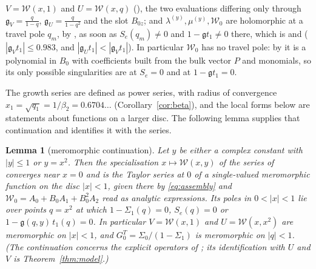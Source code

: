 \documentclass[11pt]{article}
\theoremstyle{plain}
\newtheorem{lemma}[theorem]{Lemma}
\theoremstyle{definition}
\theoremstyle{remark}
\theoremstyle{plain}\newtheorem*{maintheorem}{Main Theorem}
\begin{document}
$V=\mathcal W(x,1)$ and $U=\mathcal W(x,q)$ ({\cite[\S\,\textup{sec:bridge}]{Bonfioli2026bB}}), the two evaluations differing
only through $\mathfrak g_V=\tfrac q{1-q}$, $\mathfrak g_U=\tfrac q{1-q^2}$ and the slot $B_{0z}$;
and $\lambda^{(y)},\mu^{(y)},\mathcal W_0$ are holomorphic at a travel pole $q_m$, by
{\cite[\textup{(eq:smresolvent)}]{Bonfioli2026bB}}, as soon as $S_e(q_m)\ne0$ and $1-\mathfrak gt_1\ne0$ there, which is
{\cite[Proposition \textup{prop:selower}]{Bonfioli2026bB}} and {\cite[Corollary ``the gate closes'', \textup{app:gate}]{Bonfioli2026bB}} ($|\mathfrak g_Vt_1|\le0.983$, and
$|\mathfrak g_Ut_1|<|\mathfrak g_Vt_1|$). In particular $\mathcal W_0$ has no travel pole: by
{\cite[Remark ``the regrouping of $\mathcal W_0$'', \textup{M3:rem:W0regroup}]{Bonfioli2026bB}} it is a polynomial in $B_0$ with coefficients built from the bulk
vector $P$ and monomials, so its only possible singularities are at $S_e=0$ and at
$1-\mathfrak gt_1=0$.

The growth series are defined as power series, with radius of convergence
$x_1=\sqrt{q_1}=1/\beta_2=0.6704\ldots$ (Corollary~\ref{cor:beta}), and the local forms below are
statements about functions on a larger disc. The following lemma supplies that continuation and
identifies it with the series.

\begin{lemma}[meromorphic continuation]\label{lem:mero}
Let $y$ be either a complex constant with $|y|\le1$ or $y=x^2$. Then the specialisation
$x\mapsto\mathcal W(x,y)$ of the series of {\cite[Theorem ``\textup{(M3$'$)}'', \textup{thm:M3prime}]{Bonfioli2026bB}} converges near $x=0$ and is
the Taylor series at $0$ of a single-valued meromorphic function on the disc $|x|<1$, given there
by \eqref{eq:assembly} and $\mathcal W_0=A_0+B_0A_1+B_0^2A_2$ read as analytic expressions. Its
poles in $0<|x|<1$ lie over points $q=x^2$ at which $1-\Sigma_1(q)=0$, $S_e(q)=0$ or
$1-\mathfrak g(q,y)\,t_1(q)=0$. In particular $V=\mathcal W(x,1)$ and $U=\mathcal W(x,x^2)$ are
meromorphic on $|x|<1$, and $G^T_0=\Sigma_0/(1-\Sigma_1)$ is meromorphic on $|q|<1$.
\textup{(}The continuation concerns the explicit operators of \cite[\S\S\,\textup{sec:sect}--\textup{sec:mob}]{Bonfioli2026bB}; its
identification with $U$ and $V$ is Theorem~\ref{thm:model}.\textup{)}
\end{lemma}
\end{document}
